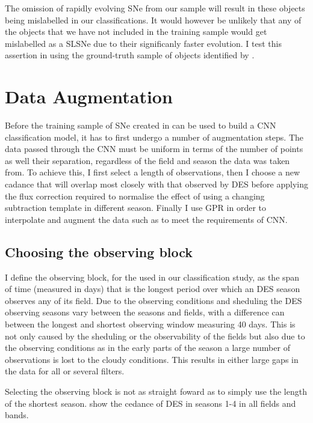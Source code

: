 The omission of rapidly evolving SNe from our sample will result in these objects being mislabelled in our classifications. It would however be unlikely that any of the objects that we have not included in the training sample would get mislabelled as a SLSNe due to their significanly faster evolution. I test this assertion in  using the ground-truth sample of objects identified by \citet{Pursiainen2018}.

\section{Data Augmentation} \label{sec:DataAugmentation}
Before the training sample of SNe created in  can be used to build a CNN classification model, it has to first undergo a number of augmentation steps. The data passed through the CNN must be uniform in terms of the number of points as well  their separation, regardless of the field and season the data was taken from. To achieve this, I first select a length of observations, then I choose a new cadance that will overlap most closely with that observed by DES before applying the flux correction required to normalise the effect of using a changing subtraction template in different season. Finally I use GPR in order to interpolate and augment the data such as to meet the requirements of CNN.

\subsection{Choosing the observing block} \label{sec:ObsBlock}
I define the observing block, for the used in our classification study, as the span of time (measured in days) that is the longest period over which an DES season observes any of its field. Due to the observing conditions and sheduling the DES observing seasons vary between the seasons and fields, with a difference can between the longest and shortest observing window measuring 40 days. This is not only caused by the sheduling or the observability of the fields but also due to the observing conditions as in the early parts of the season a large number of observations is lost to the cloudy conditions. This results in either large gaps in the data for all or several filters.

Selecting the observing block is not as straight foward as to simply use the length of the shortest season.  show the cedance of DES in seasons 1-4 in all fields and bands.


